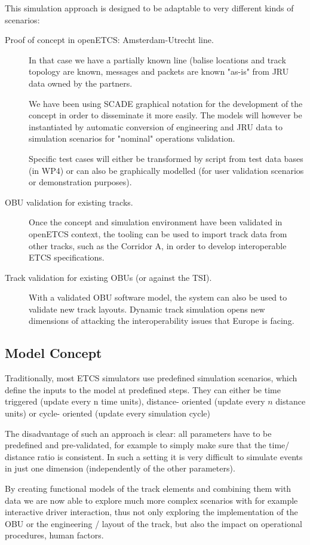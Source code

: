 This simulation approach is designed to be adaptable to very different kinds of scenarios:
\begin{description}
\item[Proof of concept in openETCS: Amsterdam-Utrecht line.]
In that case we have a partially known line (balise locations and track topology are known, messages and packets are known "as-is" from JRU data owned by the partners.

We have been using SCADE graphical notation for the development of the concept in order to disseminate it more easily.
The models will however be instantiated by automatic conversion of engineering and JRU data to simulation scenarios for "nominal" operations validation.

Specific test cases will either be transformed by script from test data bases (in WP4) or can also be graphically modelled (for user validation scenarios or demonstration purposes).
\item[OBU validation for existing tracks.]
Once the concept and simulation environment have been validated in openETCS context, the tooling can be used to import track data from other tracks, such as the Corridor A, in order to develop interoperable ETCS specifications.
\item[Track validation for existing OBUs (or against the TSI).]
With a validated OBU software model, the system can also be used to validate new track layouts. Dynamic track simulation opens new dimensions of attacking the interoperability issues that Europe is facing.
\end{description}
\subsection{Model Concept}

Traditionally, most ETCS simulators use predefined simulation scenarios, which define the inputs to the model at predefined steps.
They can either be time triggered (update every n time units), distance- oriented (update every $n$ distance units) or cycle- oriented (update every simulation cycle)

The disadvantage of such an approach is clear: all parameters have to be predefined and pre-validated, for example to simply make sure that the time/ distance ratio is consistent.
In such a setting it is very difficult to simulate events in just one dimension (independently of the other parameters).

By creating functional models of the track elements and combining them with data we are now able to explore much more complex scenarios with for example interactive driver interaction, thus not only exploring the implementation of the OBU or the engineering / layout of the track, but also the impact on operational procedures, human factors.

